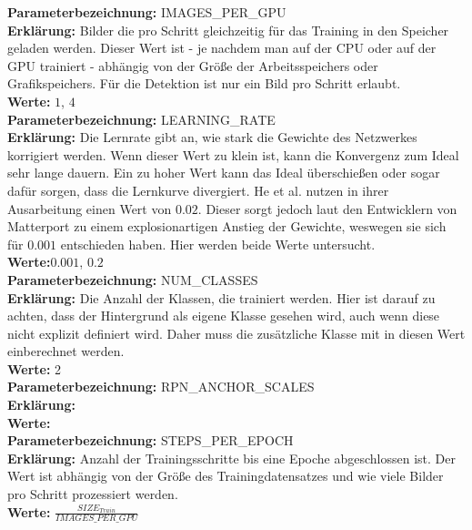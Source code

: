 \noindent
\textbf{Parameterbezeichnung:} IMAGES\_PER\_GPU\\
\textbf{Erklärung:} Bilder die pro Schritt gleichzeitig für das Training in den Speicher geladen werden. Dieser Wert ist - je nachdem man auf der CPU oder auf der GPU trainiert - abhängig von der Größe der Arbeitsspeichers oder Grafikspeichers. Für die Detektion ist nur ein Bild pro Schritt erlaubt.\\
\textbf{Werte:} $1$, $4$\\

\noindent
\textbf{Parameterbezeichnung:} LEARNING\_RATE\\
\textbf{Erklärung:} Die Lernrate gibt an, wie stark die Gewichte des Netzwerkes korrigiert werden. Wenn dieser Wert zu klein ist, kann die Konvergenz zum Ideal sehr lange dauern. Ein zu hoher Wert kann das Ideal überschießen oder sogar dafür sorgen, dass die Lernkurve divergiert. He et al. nutzen in ihrer Ausarbeitung einen Wert von $0.02$.\cite{ref:maskrcnn} Dieser sorgt jedoch laut den Entwicklern von Matterport zu einem explosionartigen Anstieg der Gewichte, weswegen sie sich für $0.001$ entschieden haben.\cite{ref:matterport} Hier werden beide Werte untersucht.\\
\textbf{Werte:}$0.001$, $0.2$\\

\noindent
\textbf{Parameterbezeichnung:} NUM\_CLASSES\\
\textbf{Erklärung:} Die Anzahl der Klassen, die trainiert werden. Hier ist darauf zu achten, dass der Hintergrund als eigene Klasse gesehen wird, auch wenn diese nicht explizit definiert wird. Daher muss die zusätzliche Klasse mit in diesen Wert einberechnet werden.\\
\textbf{Werte:} 2\\

\noindent
\textbf{Parameterbezeichnung:} RPN\_ANCHOR\_SCALES\\
\textbf{Erklärung:} \\
\textbf{Werte:} \\

\noindent
\textbf{Parameterbezeichnung:} STEPS\_PER\_EPOCH\\
\textbf{Erklärung:} Anzahl der Trainingsschritte bis eine Epoche abgeschlossen ist. Der Wert ist abhängig von der Größe des Trainingdatensatzes und wie viele Bilder pro Schritt prozessiert werden.\\
\textbf{Werte:} $\frac{SIZE_{Train}}{IMAGES\_PER\_GPU}$\\

